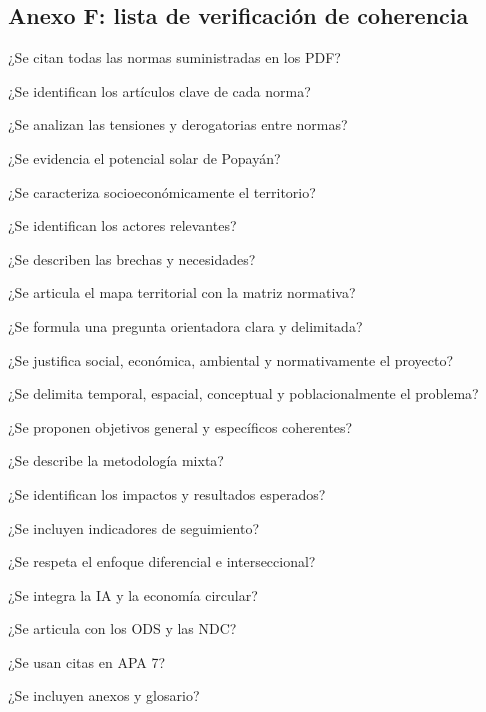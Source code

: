 \subsection{Anexo F: lista de verificación de coherencia}
\item ¿Se citan todas las normas suministradas en los PDF?
\item ¿Se identifican los artículos clave de cada norma?
\item ¿Se analizan las tensiones y derogatorias entre normas?
\item ¿Se evidencia el potencial solar de Popayán?
\item ¿Se caracteriza socioeconómicamente el territorio?
\item ¿Se identifican los actores relevantes?
\item ¿Se describen las brechas y necesidades?
\item ¿Se articula el mapa territorial con la matriz normativa?
\item ¿Se formula una pregunta orientadora clara y delimitada?
\item ¿Se justifica social, económica, ambiental y normativamente el proyecto?
\item ¿Se delimita temporal, espacial, conceptual y poblacionalmente el problema?
\item ¿Se proponen objetivos general y específicos coherentes?
\item ¿Se describe la metodología mixta?
\item ¿Se identifican los impactos y resultados esperados?
\item ¿Se incluyen indicadores de seguimiento?
\item ¿Se respeta el enfoque diferencial e interseccional?
\item ¿Se integra la IA y la economía circular?
\item ¿Se articula con los ODS y las NDC?
\item ¿Se usan citas en APA 7?
\item ¿Se incluyen anexos y glosario?
